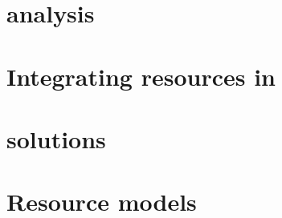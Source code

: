 

\section{\texorpdfstring{}{Resource Management Frameworks (RMFs)} analysis}

\newpage

\section{Integrating \texorpdfstring{}{INP} resources in \texorpdfstring{}{Resource Managers (RMs)}}

\newpage

\section{\texorpdfstring{}{INP} solutions}

\newpage

\section{Resource models} \label{models_analysis}
